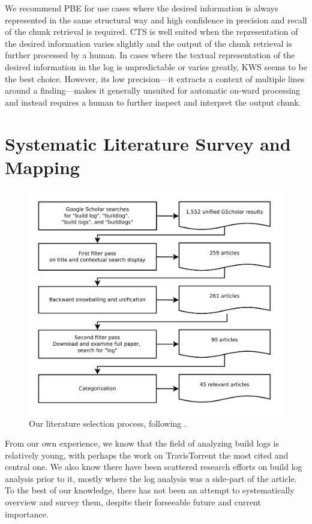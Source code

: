 We recommend PBE for use cases where the desired information is always
represented in the same structural way and high confidence in precision and
recall of the chunk retrieval is required.
CTS is well suited when the representation of the desired information varies
slightly and the output of the chunk retrieval is further processed by a human.
In cases where the textual representation of the desired information in the log
is unpredictable or varies greatly, KWS seems to be the best choice. However,
its low precision---it extracts a context of multiple lines around a
finding---makes it generally unsuited for automatic on-ward processing and
instead requires a human to further inspect and interpret the output chunk.

\section{Systematic Literature Survey and Mapping}
\label{sec:survey}

\begin{figure}[htb]
        \centering
	\includegraphics[width=\columnwidth, clip]{img/lit_survey.pdf}
	\caption{Our literature selection process, following \cite{petersen2015guidelines}.}
	\label{fig:lit-survey}
\end{figure}

From our own experience, we know that the field of analyzing build
logs is relatively young, with perhaps the work on TravisTorrent the
most cited and central one. We also know there have been scattered
research efforts on build log analysis prior to it, mostly where the
log analysis was a side-part of the article. To the best of our
knowledge, there has not been an attempt to systematically overview
and survey them, despite their forseeable future and current importance.

